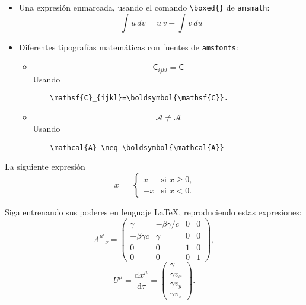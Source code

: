 \documentclass[11pt]{exam}
\begin{document}
\begin{questions}
\begin{itemize}
\item Una expresión enmarcada, usando el comando \verb|\boxed{}| de \texttt{amsmath}:
\newline
\begin{equation*}
\boxed{\int u \, dv=u\,v-\int v \, du}
\end{equation*}

\item Diferentes tipografías matemáticas con fuentes de \texttt{amsfonts}:
\begin{itemize}
\item 
\begin{equation}
\mathsf{C}_{ijkl}=\boldsymbol{\mathsf{C}}
\end{equation}
Usando

\begin{verbatim}
	\mathsf{C}_{ijkl}=\boldsymbol{\mathsf{C}}.
\end{verbatim}

\item 
\begin{equation}
\mathcal{A} \neq \boldsymbol{\mathcal{A}}
\end{equation}
Usando

\begin{verbatim}
	\mathcal{A} \neq \boldsymbol{\mathcal{A}}
\end{verbatim}


\end{itemize}
\end{itemize}
\item La siguiente expresión
\begin{equation}
 |x| = \left\{ \begin{array}{ll}
         x & \mbox{si $x \geq 0$},\\
        -x & \mbox{si $x < 0$}.\end{array} \right.
\end{equation}

\item Siga entrenando sus poderes en lenguaje \LaTeX, reproduciendo estas expresiones:
\begin{equation}
\Lambda^{\mu'}{}_\nu = \begin{pmatrix}
\gamma & -\beta\gamma/c & 0 & 0\\
-\beta\gamma c & \gamma & 0 & 0\\
0 & 0 & 1 & 0\\
0 & 0 & 0 & 1 \end{pmatrix},
\end{equation}
\begin{equation}
U^\mu = \frac{\text{d}x^\mu}{\text{d}\tau} =
\begin{pmatrix} \gamma \\ \gamma v_x \\ \gamma v_y \\ \gamma v_z \end{pmatrix}.
\end{equation}


\end{questions}
\end{document}
